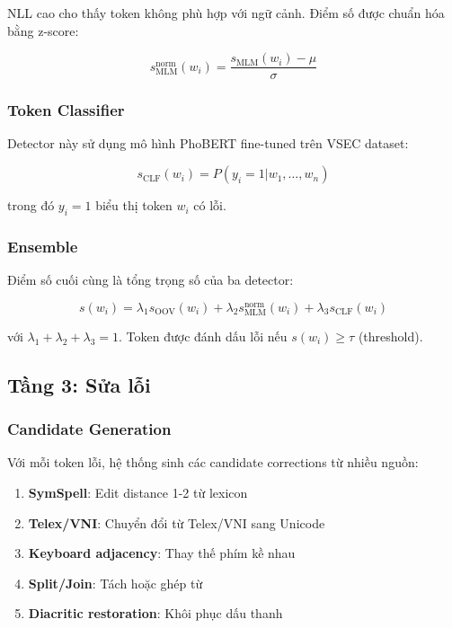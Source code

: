 \documentclass[conference]{IEEEtran}
\begin{document}
NLL cao cho thấy token không phù hợp với ngữ cảnh. Điểm số được chuẩn hóa bằng z-score:

\begin{equation}
s_{\text{MLM}}^{\text{norm}}(w_i) = \frac{s_{\text{MLM}}(w_i) - \mu}{\sigma}
\end{equation}

\subsubsection{Token Classifier}
Detector này sử dụng mô hình PhoBERT fine-tuned trên VSEC dataset:

\begin{equation}
s_{\text{CLF}}(w_i) = P(y_i = 1 | w_1, \ldots, w_n)
\end{equation}

trong đó $y_i = 1$ biểu thị token $w_i$ có lỗi.

\subsubsection{Ensemble}
Điểm số cuối cùng là tổng trọng số của ba detector:

\begin{equation}
s(w_i) = \lambda_1 s_{\text{OOV}}(w_i) + \lambda_2 s_{\text{MLM}}^{\text{norm}}(w_i) + \lambda_3 s_{\text{CLF}}(w_i)
\end{equation}

với $\lambda_1 + \lambda_2 + \lambda_3 = 1$. Token được đánh dấu lỗi nếu $s(w_i) \geq \tau$ (threshold).

\subsection{Tầng 3: Sửa lỗi}

\subsubsection{Candidate Generation}
Với mỗi token lỗi, hệ thống sinh các candidate corrections từ nhiều nguồn:

\begin{enumerate}
    \item \textbf{SymSpell}: Edit distance 1-2 từ lexicon
    \item \textbf{Telex/VNI}: Chuyển đổi từ Telex/VNI sang Unicode
    \item \textbf{Keyboard adjacency}: Thay thế phím kề nhau
    \item \textbf{Split/Join}: Tách hoặc ghép từ
    \item \textbf{Diacritic restoration}: Khôi phục dấu thanh
\end{enumerate}
\end{document}
